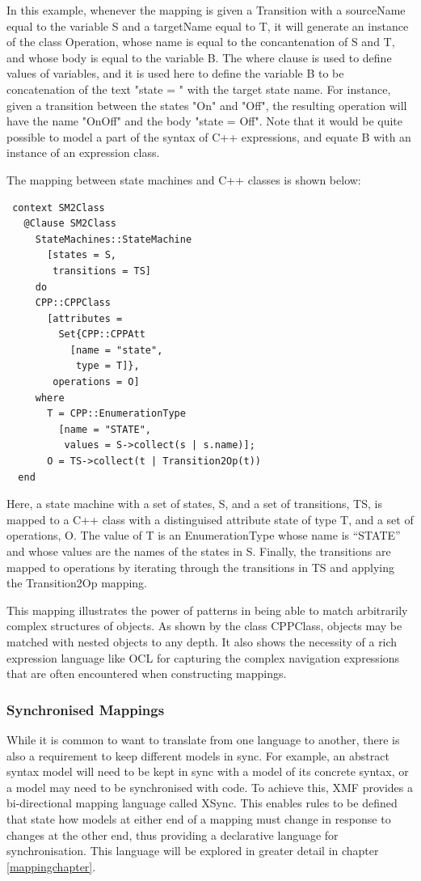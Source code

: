 In this example, whenever the mapping is given a Transition with a
sourceName equal to the variable S and a targetName equal to T, it
will generate an instance of the class Operation, whose name is
equal to the concantenation of S and T, and whose body is equal to
the variable B. The where clause is used to define values of
variables, and it is used here to define the variable B to be
concatenation of the text "state = " with the target state name.
For instance, given a transition between the states "On" and
"Off", the resulting operation will have the name "OnOff" and the
body "state = Off". Note that it would be quite possible to model
a part of the syntax of {C++} expressions, and equate B with an
instance of an expression class.

The mapping between state machines and {C++} classes is shown below:


\begin{lstlisting}
 context SM2Class
   @Clause SM2Class
     StateMachines::StateMachine
       [states = S,
        transitions = TS]
     do
     CPP::CPPClass
       [attributes =
         Set{CPP::CPPAtt
           [name = "state",
            type = T]},
        operations = O]
     where
       T = CPP::EnumerationType
         [name = "STATE",
          values = S->collect(s | s.name)];
       O = TS->collect(t | Transition2Op(t))
  end
\end{lstlisting}
Here, a state machine with a set of states, S, and a set of
transitions, TS, is mapped to a {C++} class with a distinguised
attribute state of type T, and a set of operations, O. The value
of T is an EnumerationType whose name is ``STATE'' and whose
values are the names of the states in S. Finally, the transitions
are mapped to operations by iterating through the transitions in
TS and applying the Transition2Op mapping.

This mapping illustrates the power of patterns in being able to
match arbitrarily complex structures of objects. As shown by the
class CPPClass, objects may be matched with nested objects to any
depth. It also shows the necessity of a rich expression language
like OCL for capturing the complex navigation expressions that are
often encountered when constructing mappings.

\subsubsection{Synchronised Mappings}

While it is common to want to translate from one language to
another, there is also a requirement to keep different models in
sync. For example, an abstract syntax model will need to be kept
in sync with a model of its concrete syntax, or a model may need
to be synchronised with code. To achieve this, XMF provides a
bi-directional mapping language called XSync. This enables rules
to be defined that state how models at either end of a mapping
must change in response to changes at the other end, thus
providing a declarative language for synchronisation. This
language will be explored in greater detail in chapter
\ref{mappingchapter}.

